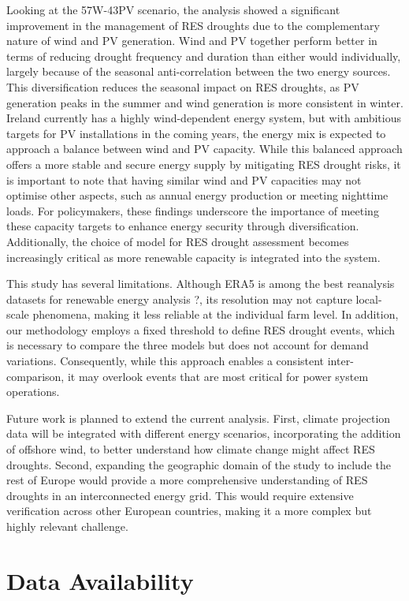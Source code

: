 \documentclass[preprint, 12pt]{elsarticle}
\begin{document}
Looking at the 57W-43PV scenario, the analysis showed a significant improvement in the management of RES droughts due to the complementary nature of wind and PV generation. Wind and PV together perform better in terms of reducing drought frequency and duration than either would individually, largely because of the seasonal anti-correlation between the two energy sources. This diversification reduces the seasonal impact on RES droughts, as PV generation peaks in the summer and wind generation is more consistent in winter. Ireland currently has a highly wind-dependent energy system, but with ambitious targets for PV installations in the coming years, the energy mix is expected to approach a balance between wind and PV capacity. While this balanced approach offers a more stable and secure energy supply by mitigating RES drought risks, it is important to note that having similar wind and PV capacities may not optimise other aspects, such as annual energy production or meeting nighttime loads. For policymakers, these findings underscore the importance of meeting these capacity targets to enhance energy security through diversification. Additionally, the choice of model for RES drought assessment becomes increasingly critical as more renewable capacity is integrated into the system.

This study has several limitations. Although ERA5 is among the best reanalysis datasets for renewable energy analysis \citep{doi:10.3390/atmos12050624} ?, its resolution may not capture local-scale phenomena, making it less reliable at the individual farm level. In addition, our methodology employs a fixed threshold to define RES drought events, which is necessary to compare the three models but does not account for demand variations. Consequently, while this approach enables a consistent inter-comparison, it may overlook events that are most critical for power system operations.

Future work is planned to extend the current analysis. First, climate projection data will be integrated with different energy scenarios, incorporating the addition of offshore wind, to better understand how climate change might affect RES droughts. Second, expanding the geographic domain of the study to include the rest of Europe would provide a more comprehensive understanding of RES droughts in an interconnected energy grid. This would require extensive verification across other European countries, making it a more complex but highly relevant challenge.

\section*{Data Availability}
\end{document}
